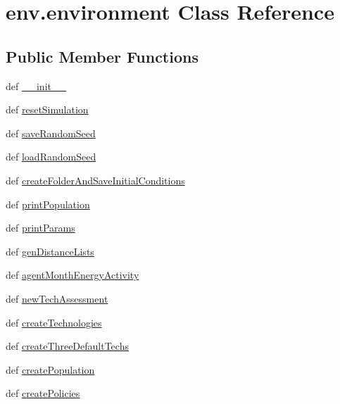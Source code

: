 \hypertarget{classenv_1_1environment}{\section{env.\-environment Class Reference}
\label{classenv_1_1environment}
}
\subsection*{Public Member Functions}
\begin{DoxyCompactItemize}
\item 
def \hyperlink{classenv_1_1environment_af0b315b35bdaf6e79fc617dc9a5d7e14}{\-\_\-\-\_\-init\-\_\-\-\_\-}
\item 
def \hyperlink{classenv_1_1environment_a909e820746c85ccba8d59f68849df14b}{reset\-Simulation}
\item 
def \hyperlink{classenv_1_1environment_a91c605b4376743de7d601bc00021af25}{save\-Random\-Seed}
\item 
def \hyperlink{classenv_1_1environment_a7ebc3c759ded97ca6a8e5d081d164eb2}{load\-Random\-Seed}
\item 
def \hyperlink{classenv_1_1environment_a3025fbd44e1503a22b69f448b14ab3db}{create\-Folder\-And\-Save\-Initial\-Conditions}
\item 
def \hyperlink{classenv_1_1environment_a75e9eb9da0217b421098dcfecefc123d}{print\-Population}
\item 
def \hyperlink{classenv_1_1environment_a8118c01b8cefe9528b5f92e5a8bd1c1c}{print\-Params}
\item 
def \hyperlink{classenv_1_1environment_a2e6224365cea0e96095169cf6d6ebbd8}{gen\-Distance\-Lists}
\item 
def \hyperlink{classenv_1_1environment_ad363dabf40762dee9ed2ee6386d5a3a6}{agent\-Month\-Energy\-Activity}
\item 
def \hyperlink{classenv_1_1environment_a4ad1727e2bff9555d229536982c2012b}{new\-Tech\-Assessment}
\item 
def \hyperlink{classenv_1_1environment_aa278e826d1c5fd1cd4c9c2a71c1db979}{create\-Technologies}
\item 
def \hyperlink{classenv_1_1environment_ad8b32b7b3829723202f108cd96fa2851}{create\-Three\-Default\-Techs}
\item 
def \hyperlink{classenv_1_1environment_a77475081886b15107bb449e32f026893}{create\-Population}
\item 
def \hyperlink{classenv_1_1environment_a4fddb57b6058168f8c0ae4511e8b76f6}{create\-Policies}

\end{DoxyCompactItemize}
